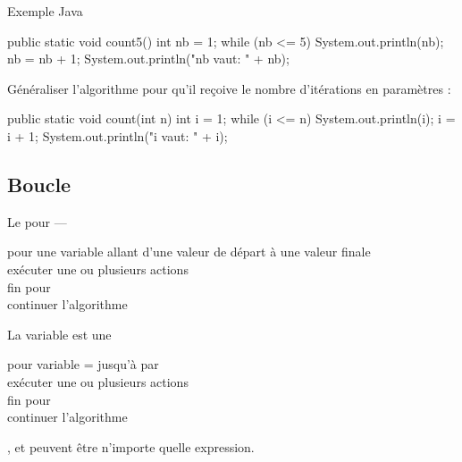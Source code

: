 \begin{hideedit}
\begin{frame}[fragile]{Exemple Java}
  \begin{java}
public static void count5() {
    int nb = 1;
    while (nb <= 5) {
        System.out.println(nb);
        nb = nb + 1;
    }
    System.out.println("nb vaut: " + nb);
}
  \end{java}
\end{frame}

\begin{frame}[fragile]
  Généraliser l'algorithme pour qu'il reçoive le nombre
  d'itérations en paramètres :
  \pause
  \begin{java}
public static void count(int n) {
    int i = 1;
    while (i <= n) {
        System.out.println(i);
        i = i + 1;
    }
    System.out.println("i vaut: " + i);
}
  \end{java}
\end{frame}

\subsection{Boucle }
\begin{frame}{Le \og pour \fg --- }
  \begin{langagenaturel}
    pour une variable allant d'une valeur de départ à une valeur finale\\
    \tab exécuter une ou plusieurs actions\\
    fin pour \\
    continuer l'algorithme
  \end{langagenaturel}

  \pause
  La variable est une 

  \pause
  \begin{langagenaturel}
    pour variable =  jusqu'à  par \\
    \tab exécuter une ou plusieurs actions\\
    fin pour \\
    continuer l'algorithme
  \end{langagenaturel}

  ,  et  peuvent être n'importe quelle expression.
\end{frame}


\end{hideedit}
